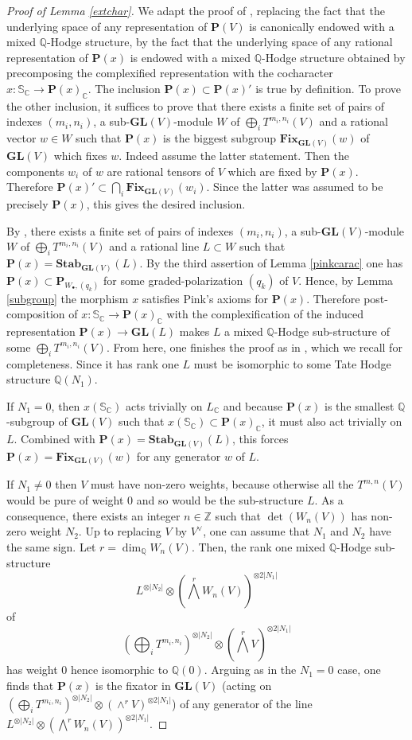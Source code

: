 \documentclass[10pt]{article}
\numberwithin{equation}{subsection}
\theoremstyle{plain}
\theoremstyle{definition}
\theoremstyle{remark}
\newcommand{\Z}{\mathbb Z}
\newcommand{\Q}{\mathbb Q}
\newcommand{\C}{\mathbb C}
\newcommand{\s}{\mathbb S}
\newcommand{\pp}{\mathbf P}
\newcommand{\fix}{\mathbf{Fix}}
\newcommand{\stab}{\mathbf{Stab}}
\newcommand{\bul}{\bullet}
\newcommand{\gl}{\mathbf{GL}}
\newcommand{\ppol}{\pp_{W_\bul, (q_k)}}
\begin{document}
\begin{proof}[Proof of Lemma \ref{extchar}]
We adapt the proof of \cite[Lem. 2.(a)]{andre}, replacing the fact that the underlying space of any representation of $\pp(V)$ is canonically endowed with a mixed $\Q$-Hodge structure, by the fact that the underlying space of any rational representation of $\pp(x)$ is endowed with a mixed $\Q$-Hodge structure obtained by precomposing the complexified representation with the cocharacter $x: \s_\C \rightarrow \pp(x)_\C$. The inclusion $\pp(x) \subset \pp(x)'$ is true by definition. To prove the other inclusion, it suffices to prove that there exists a finite set of pairs of indexes $(m_i, n_i)$, a sub-$\gl(V)$-module $W$ of $\bigoplus_i T^{m_i, n_i}(V)$ and a rational vector $w \in W$ such that $\pp(x)$ is the biggest subgroup $\fix_{\gl(V)}(w)$ of $\gl(V)$ which fixes $w$. Indeed assume the latter statement. Then the components $w_i$ of $w$ are rational tensors of $V$ which are fixed by $\pp(x)$. Therefore $\pp(x)' \subset \bigcap_i \fix_{\gl(V)}(w_i)$. Since the latter was assumed to be precisely $\pp(x)$, this gives the desired inclusion.

By \cite[Prop. 3.1(a)-(b))]{delabs}, there exists a finite set of pairs of indexes $(m_i, n_i)$, a sub-$\gl(V)$-module $W$ of $\bigoplus_i T^{m_i, n_i}(V)$ and a rational line $L \subset W$ such that $\pp(x) = \stab_{\gl(V)}(L)$. By the third assertion of Lemma \ref{pinkcarac} one has $\pp(x) \subset \ppol$ for some graded-polarization $(q_k)$ of $V$. Hence, by Lemma \ref{subgroup} the morphism $x$ satisfies Pink's axioms for $\pp(x)$. Therefore post-composition of $x : \s_\C \rightarrow \pp(x)_\C$ with the complexification of the induced representation $\pp(x) \rightarrow \gl(L)$ makes $L$ a mixed $\Q$-Hodge sub-structure of some $\bigoplus_i T^{m_i,n_i}(V)$. From here, one finishes the proof as in \cite[Lem. 2(a)]{andre}, which we recall for completeness. Since it has rank one $L$ must be isomorphic to some Tate Hodge structure $\Q(N_1)$. 

If $N_1 = 0$, then $x(\s_\C)$ acts trivially on $L_\C$ and because $\pp(x)$ is the smallest $\Q$-subgroup of $\gl(V)$ such that $x(\s_\C) \subset \pp(x)_\C$, it must also act trivially on $L$. Combined with $\pp(x) = \stab_{\gl(V)}(L)$, this forces $\pp(x) = \fix_{\gl(V)}(w)$ for any generator $w$ of $L$.

If $N_1 \neq 0$ then $V$ must have non-zero weights, because otherwise all the $T^{m,n}(V)$ would be pure of weight $0$ and so would be the sub-structure $L$. As a consequence, there exists an integer $n \in \Z$ such that $\det(W_n(V))$ has non-zero weight $N_2$. Up to replacing $V$ by $V^\vee$, one can assume that $N_1$ and $N_2$ have the same sign. Let $r = \dim_\Q W_n(V)$. Then, the rank one mixed $\Q$-Hodge sub-structure 
\[
L^{\otimes |N_2|} \otimes (\bigwedge^r W_n(V))^{\otimes 2|N_1|}
\]
of 
\[
(\bigoplus_i T^{m_i,n_i})^{\otimes |N_2|} \otimes (\bigwedge^r V)^{\otimes 2|N_1|}
\]
has weight $0$ hence isomorphic to $\Q(0)$. Arguing as in the $N_1 = 0$ case, one finds that $\pp(x)$ is the fixator in $\gl(V)$ (acting on $(\bigoplus_i T^{m_i,n_i})^{\otimes |N_2|} \otimes (\wedge^r V)^{\otimes 2|N_1|}$) of any generator of the line $L^{\otimes |N_2|} \otimes (\bigwedge^r W_n(V))^{\otimes 2|N_1|}$.


\end{proof}
\end{document}
